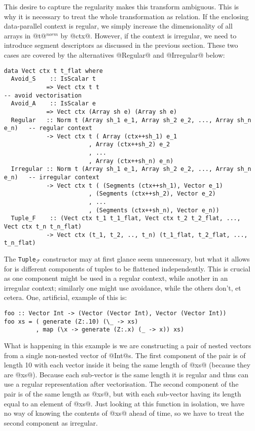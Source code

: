 This desire to capture the regularity makes this transform ambiguous. This is why it is necessary to treat the whole transformation as relation. If the enclosing data-parallel context is regular, we simply increase the dimensionality of all arrays in @t@$^{\textit{norm}}$ by @ctx@. However, if the context is irregular, we need to introduce segment descriptors as discussed in the previous section. These two cases are covered by the alternatives @Regular@ and @Irregular@ below:
%
\begin{lstlisting}[style=ndp]
data Vect ctx t t_flat where
  Avoid_S    :: IsScalar t
            => Vect ctx t t                                              -- avoid vectorisation
  Avoid_A    :: IsScalar e
            => Vect ctx (Array sh e) (Array sh e)
  Regular   :: Norm t (Array sh_1 e_1, Array sh_2 e_2, ..., Array sh_n e_n)   -- regular context
            -> Vect ctx t ( Array (ctx++sh_1) e_1
                        , Array (ctx++sh_2) e_2
                        , ...
                        , Array (ctx++sh_n) e_n)
  Irregular :: Norm t (Array sh_1 e_1, Array sh_2 e_2, ..., Array sh_n e_n)   -- irregular context
            -> Vect ctx t ( (Segments (ctx++sh_1), Vector e_1)
                        , (Segments (ctx++sh_2), Vector e_2)
                        , ...
                        , (Segments (ctx++sh_n), Vector e_n))
  Tuple_F    :: (Vect ctx t_1 t_1_flat, Vect ctx t_2 t_2_flat, ..., Vect ctx t_n t_n_flat)
            -> Vect ctx (t_1, t_2, .., t_n) (t_1_flat, t_2_flat, ..., t_n_flat)
\end{lstlisting}
%
The \lstinline[style=ndp]{Tuple}$_\mathcal{F}$ constructor may at first glance seem unnecessary, but what it allows for is different components of tuples to be flattened independently. This is crucial as one component might be used in a regular context, while another in an irregular context; similarly one might use avoidance, while the others don't, et cetera. One, artificial, example of this is:
%
\begin{lstlisting}[style=ndp]
foo :: Vector Int -> (Vector (Vector Int), Vector (Vector Int))
foo xs = ( generate (Z:.10) (\_ -> xs)
         , map (\x -> generate (Z:.x) (_ -> x)) xs)
\end{lstlisting}
%
What is happening in this example is we are constructing a pair of nested vectors from a single non-nested vector of @Int@s. The first component of the pair is of length 10 with each vector inside it being the same length of @xs@ (because they are @xs@). Because each sub-vector is the same length it is regular and thus can use a regular representation after vectorisation. The second component of the pair is of the same length as @xs@, but with each sub-vector having its length equal to an element of @xs@. Just looking at this function in isolation, we have no way of knowing the contents of @xs@ ahead of time, so we have to treat the second component as irregular.


